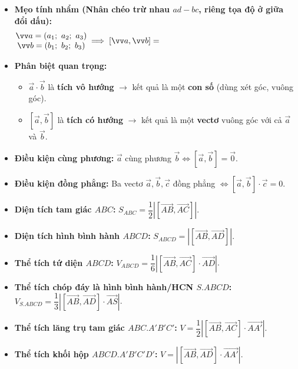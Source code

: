 \documentclass[12pt, a4paper]{article}
\begin{document}
\begin{theorybox}
    \begin{itemize}\setlength{\itemsep}{3pt}\setlength{\parskip}{0pt}
        \item \textbf{Mẹo tính nhẩm (Nhân chéo trừ nhau $ad - bc$, riêng tọa độ ở giữa đổi dấu):}
        \[
        \begin{matrix}
            \vec{a} = (a_1;\ a_2;\ a_3) \\
            \vec{b} = (b_1;\ b_2;\ b_3)
        \end{matrix}
        \implies [\vec{a}, \vec{b}] = \hspace{6.5cm}
        \]
        \item \textbf{Phân biệt quan trọng:}
        \begin{itemize}\setlength{\itemsep}{1.5pt}
            \item $\vec{a} \cdot \vec{b}$ là \textbf{tích vô hướng} $\longrightarrow$ kết quả là một \textbf{con số} (dùng xét góc, vuông góc).
            \item $[\vec{a}, \vec{b}]$ là \textbf{tích có hướng} $\longrightarrow$ kết quả là một \textbf{vectơ} vuông góc với cả $\vec{a}$ và $\vec{b}$.
        \end{itemize}
        \item \textbf{Điều kiện cùng phương:} $\vec{a}$ cùng phương $\vec{b} \iff [\vec{a}, \vec{b}] = \vec{0}$.
        \item \textbf{Điều kiện đồng phẳng:} Ba vectơ $\vec{a}, \vec{b}, \vec{c}$ đồng phẳng $\iff [\vec{a}, \vec{b}] \cdot \vec{c} = 0$.
        \item \textbf{Diện tích tam giác $ABC$:} $S_{ABC} = \dfrac{1}{2} \left| [\vec{AB}, \vec{AC}] \right|$.
        \item \textbf{Diện tích hình bình hành $ABCD$:} $S_{ABCD} = \left| [\vec{AB}, \vec{AD}] \right|$.
        \item \textbf{Thể tích tứ diện $ABCD$:} $V_{ABCD} = \dfrac{1}{6} \left| [\vec{AB}, \vec{AC}] \cdot \vec{AD} \right|$.
        \item \textbf{Thể tích chóp đáy là hình bình hành/HCN $S.ABCD$:} $V_{S.ABCD} = \dfrac{1}{3} \left| [\vec{AB}, \vec{AD}] \cdot \vec{AS} \right|$.
        \item \textbf{Thể tích lăng trụ tam giác $ABC.A'B'C'$:} $V = \dfrac{1}{2} \left| [\vec{AB}, \vec{AC}] \cdot \vec{AA'} \right|$.
        \item \textbf{Thể tích khối hộp $ABCD.A'B'C'D'$:} $V = \left| [\vec{AB}, \vec{AD}] \cdot \vec{AA'} \right|$.
    \end{itemize}
\end{theorybox}
\end{document}
